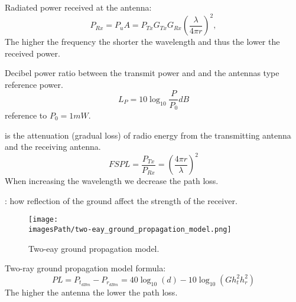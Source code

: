 Radiated power received at the antenna:
\begin{equation}
    P_{Rx} = P_uA = P_{Tx}G_{Tx}G_{Rx}\left( \frac{\lambda}{4\pi r} \right)^2,
\end{equation}
The higher the frequency the shorter the wavelength and thus the lower the received power.

Decibel power ratio between the transmit power and and the antennas type reference power.
\begin{equation}
    L_P = 10\log_{10}\frac{P}{P_0}dB
\end{equation}
reference to $P_0 = 1 mW$.

 is the attenuation (gradual loss) of radio energy 
from the transmitting antenna and the receiving antenna.
\begin{equation}
    FSPL = \frac{P_{Tx}}{P_{Rx}} = \left( \frac{4\pi r}{\lambda} \right)^2
\end{equation}
When increasing the wavelength we decrease the path loss.

: how reflection of the ground affect the strength of the receiver. 
\begin{figure}[H]
    \centering
    \texttt{[image: \\imagesPath/two-eay\_ground\_propagation\_model.png]}
    \caption{Two-eay ground propagation model.}
\end{figure}

Two-ray ground propagation model formula:
\begin{equation}
    PL = P_{t_{dBm}} - P_{r_{dBm}} = 40\log_{10}(d) - 10\log_{10}(Gh^2_th^2_r)
\end{equation}
The higher the antenna the lower the path loss.


